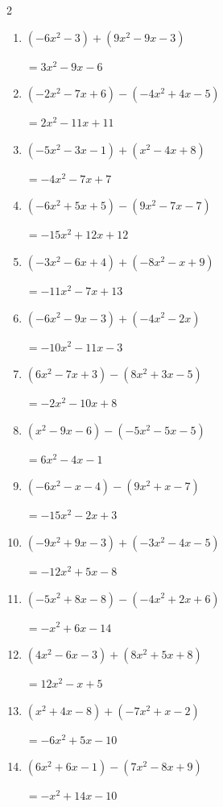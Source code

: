 \begin{multicols}{2}
\begin{enumerate}
        $=-5x+4$

  \item $(-6x^{2}-3)+(9x^{2}-9x-3)$

        $=3x^{2}-9x-6$

  \item $(-2x^{2}-7x+6)-(-4x^{2}+4x-5)$

        $=2x^{2}-11x+11$

  \item $(-5x^{2}-3x-1)+(x^{2}-4x+8)$

        $=-4x^{2}-7x+7$

  \item $(-6x^{2}+5x+5)-(9x^{2}-7x-7)$

        $=-15x^{2}+12x+12$

  \item $(-3x^{2}-6x+4)+(-8x^{2}-x+9)$

        $=-11x^{2}-7x+13$

  \item $(-6x^{2}-9x-3)+(-4x^{2}-2x)$

        $=-10x^{2}-11x-3$

  \item $(6x^{2}-7x+3)-(8x^{2}+3x-5)$

        $=-2x^{2}-10x+8$

  \item $(x^{2}-9x-6)-(-5x^{2}-5x-5)$

        $=6x^{2}-4x-1$

  \item $(-6x^{2}-x-4)-(9x^{2}+x-7)$

        $=-15x^{2}-2x+3$

  \item $(-9x^{2}+9x-3)+(-3x^{2}-4x-5)$

        $=-12x^{2}+5x-8$

  \item $(-5x^{2}+8x-8)-(-4x^{2}+2x+6)$

        $=-x^{2}+6x-14$

  \item $(4x^{2}-6x-3)+(8x^{2}+5x+8)$

        $=12x^{2}-x+5$

  \item $(x^{2}+4x-8)+(-7x^{2}+x-2)$

        $=-6x^{2}+5x-10$

  \item $(6x^{2}+6x-1)-(7x^{2}-8x+9)$

        $=-x^{2}+14x-10$


\end{enumerate}
\end{multicols}
